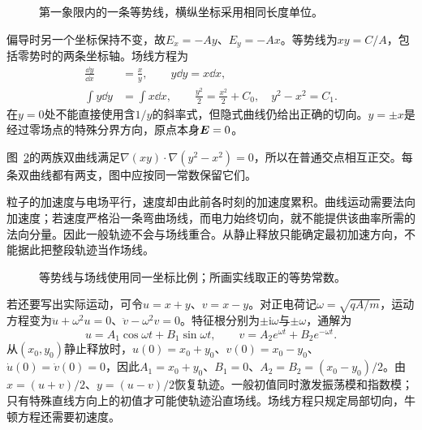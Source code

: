 \begin{figure}[H]\centering
{}
\caption{第一象限内的一条等势线，横纵坐标采用相同长度单位。}\label{fig:es1-e1-q}
\end{figure}
\begin{solution}
偏导时另一个坐标保持不变，故$E_x=-Ay$、$E_y=-Ax$。等势线为$xy=C/A$，包括零势时的两条坐标轴。场线方程为
\[\begin{aligned}
\frac{\dd y}{\dd x}&=\frac xy,\qquad y\dd y=x\dd x,\\
\int y\dd y&=\int x\dd x,\qquad \frac{y^2}2=\frac{x^2}2+C_0,
\quad \boxed{y^2-x^2=C_1}.
\end{aligned}\]
在$y=0$处不能直接使用含$1/y$的斜率式，但隐式曲线仍给出正确的切向。$y=\pm x$是经过零场点的特殊分界方向，原点本身$\bm{E}=0$。

图~\ref{fig:es1-e1-s}的两族双曲线满足$\nabla(xy)\cdot\nabla(y^2-x^2)=0$，所以在普通交点相互正交。每条双曲线都有两支，图中应按同一常数保留它们。

粒子的加速度与电场平行，速度却由此前各时刻的加速度累积。曲线运动需要法向加速度；若速度严格沿一条弯曲场线，而电力始终切向，就不能提供该曲率所需的法向分量。因此一般轨迹不会与场线重合。从静止释放只能确定最初加速方向，不能据此把整段轨迹当作场线。
\begin{figure}[H]\centering
{}
\caption{等势线与场线使用同一坐标比例；所画实线取正的等势常数。}\label{fig:es1-e1-s}
\end{figure}


若还要写出实际运动，可令$u=x+y$、$v=x-y$。对正电荷记$\omega=\sqrt{qA/m}$，运动方程变为$\ddot u+\omega^2u=0$、$\ddot v-\omega^2v=0$。特征根分别为$\pm\mathrm i\omega$与$\pm\omega$，通解为
\[u=A_1\cos\omega t+B_1\sin\omega t,\qquad
v=A_2e^{\omega t}+B_2e^{-\omega t}.\]
从$(x_0,y_0)$静止释放时，$u(0)=x_0+y_0$、$v(0)=x_0-y_0$、$\dot u(0)=\dot v(0)=0$，因此$A_1=x_0+y_0$、$B_1=0$、$A_2=B_2=(x_0-y_0)/2$。由$x=(u+v)/2$、$y=(u-v)/2$恢复轨迹。一般初值同时激发振荡模和指数模；只有特殊直线方向上的初值才可能使轨迹沿直场线。场线方程只规定局部切向，牛顿方程还需要初速度。
\end{solution}
